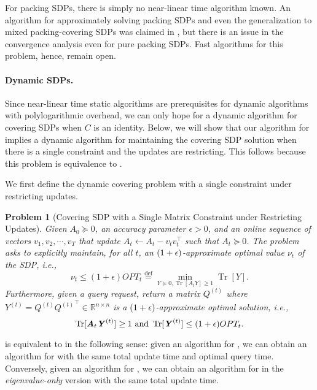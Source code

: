 \documentclass[11pt]{article}
\newcommand{\defeq}{\stackrel{\textup{def}}{=}}
\newtheorem{problem}[theorem]{Problem}
\DeclareMathOperator{\Tr}{Tr}
\let\originalleft\left
\let\originalright\right
\renewcommand{\left}{\mathopen{}\mathclose\bgroup\originalleft}
\renewcommand{\right}{\aftergroup\egroup\originalright}
\def\defeq{\stackrel{\mathrm{def}}{=}}
\newcommand\vv{\boldsymbol{\mathit{v}}}
\renewcommand\AA{\boldsymbol{\mathit{A}}}
\newcommand\CC{\boldsymbol{\mathit{C}}}
\newcommand\QQ{\boldsymbol{\mathit{Q}}}
\newcommand\YY{\boldsymbol{\mathit{Y}}}
\begin{document}
For packing SDPs, there is simply no near-linear time algorithm known. An algorithm for approximately solving packing SDPs and even the generalization to mixed packing-covering SDPs was claimed in \cite{jambulapati2021positive}, but there is an issue in the convergence analysis even for pure packing SDPs. Fast algorithms for this problem, hence, remain open.

\paragraph{Dynamic SDPs.}
Since near-linear time static algorithms are prerequisites for dynamic algorithms with polylogarithmic overhead, we can only hope for a dynamic algorithm for covering SDPs when $\CC$ is an identity. 
Below, we will show that our algorithm for  implies a dynamic algorithm for maintaining the covering SDP solution when there is a single constraint and the updates are restricting. This follows because this problem is equivalence to .



We first define the dynamic covering problem with a single constraint under restricting updates.

\begin{problem}[Covering SDP with a Single Matrix Constraint under Restricting Updates]\label{prob:dynsdp} Given $\AA_0\succeq 0$, an accuracy parameter $\epsilon>0$, and an online sequence of vectors $\vv_1,\vv_2,\cdots,\vv_T$ that update $\AA_t \gets \AA_t -\vv_t\vv_t^{\top}$ such that $\AA_t\succeq 0$. The problem asks to explicitly maintain, for all $t$, an $(1+\epsilon)$-approximate optimal value $\nu_t$ of the SDP, i.e.,  $$\nu_t \leq (1+\epsilon)OPT_t \defeq {\min}_{\YY\succeq 0, \Tr[\AA_t\YY]\geq 1}  \Tr[\YY].$$
Furthermore, given a query request, return a matrix $\QQ^{(t)}$ where $\YY^{(t)} = \QQ^{(t)}{\QQ^{(t)}}^{\top} \in \mathbb{R}^{n\times n}$ is a $(1+\epsilon)$-approximate optimal solution, i.e., 
    $$\Tr[\AA_t\YY^{(t)}]\geq 1\text{ and }\Tr[\YY^{(t)}]\leq \left(1+\epsilon\right) OPT_t.$$
\end{problem}
 is equivalent to  in the following sense: given an algorithm for , we can obtain an algorithm for  with the same total update time and optimal query time. Conversely, given an algorithm for , we can obtain an algorithm for  in the \emph{eigenvalue-only} version with the same total update time.
\end{document}
